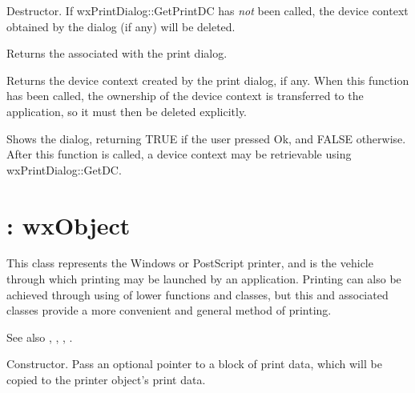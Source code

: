 

Destructor. If wxPrintDialog::GetPrintDC has {\it not} been called,
the device context obtained by the dialog (if any) will be deleted.



Returns the  associated with the print dialog.



Returns the device context created by the print dialog, if any.
When this function has been called, the ownership of the device context
is transferred to the application, so it must then be deleted
explicitly.



Shows the dialog, returning TRUE if the user pressed Ok, and FALSE
otherwise. After this function is called, a device context may
be retrievable using wxPrintDialog::GetDC.

\section{: wxObject}\label{wxprinter}


This class represents the Windows or PostScript printer, and is the vehicle through
which printing may be launched by an application. Printing can also
be achieved through using of lower functions and classes, but
this and associated classes provide a more convenient and general
method of printing.

See also , ,\rtfsp
{}, .



Constructor. Pass an optional pointer to a block of print
data, which will be copied to the printer object's print data.

